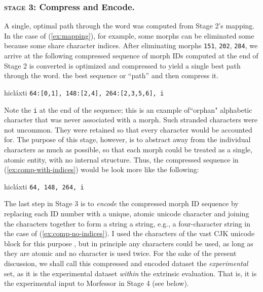 \subsubsection{\textsc{stage 3:} Compress and Encode.}
A single, optimal path through the word was computed from Stage 2's mapping. In the case of (\ref{ex:mapping}), for example, some morphs can be eliminated some because some share character indices.  After eliminating morphs \texttt{151}, \texttt{202}, \texttt{284}, we arrive at the following compressed sequence of morph IDs computed at the end of Stage 2 is converted is optimized and compressed to yield a single best path through the word. 
 the best sequence or “path” and then compress it. 
\begin{exe} \ex \label{ex:comp-with-indices} 
hicl\'{a}xti \quad \texttt{64:[0,1], 148:[2,4], 264:[2,3,5,6], i}
\end{exe}
Note the \texttt{i} at the end of the sequence; this is an example of``orphan" alphabetic character that was never associated with a morph. Such stranded characters were not uncommon. They were retained so that every character would be accounted for.
The purpose of this stage, however, is to abstract away from the individual characters as much as possible, so that each morph could be treated as a single, atomic entity, with no internal structure.
Thus, the compressed sequence in (\ref{ex:comp-with-indices}) would be look more like the following:
\begin{exe} \ex \label{ex:comp-no-indices} 
hicl\'{a}xti \quad \texttt{64, 148, 264, i}
\end{exe}
The last step in Stage 3 is to \emph{encode} the compressed morph ID sequence by replacing each  ID number with a unique, atomic unicode character and joining the characters together to form a string a string, e.g., a four-character string in the case of (\ref{ex:comp-no-indices}).
I used the characters of the vast CJK unicode block for this purpose , but in principle any characters could be used, as long as they are atomic and no character is used twice. For the sake of the present discussion, we shall call this compressed and encoded dataset the \emph{experimental} set, as it is the experimental dataset \emph{within} the extrinsic evaluation. That is, it is the experimental input to Morfessor in Stage 4 (see below). 

